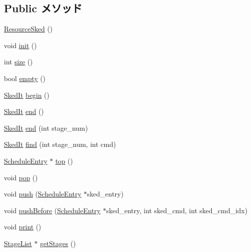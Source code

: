 \subsection*{Public メソッド}
\begin{DoxyCompactItemize}
\item 
\hyperlink{classResourceSked_aaaf7785027bb745b7d1e41dd0da8767a}{ResourceSked} ()
\item 
void \hyperlink{classResourceSked_a02fd73d861ef2e4aabb38c0c9ff82947}{init} ()
\item 
int \hyperlink{classResourceSked_af4b57d21919c42d55af03391f91a1c08}{size} ()
\item 
bool \hyperlink{classResourceSked_a3f37b042a1e7cd4bd38fc564de81f0da}{empty} ()
\item 
\hyperlink{classResourceSked_ab2a9eec675af76477619cacd99ea5225}{SkedIt} \hyperlink{classResourceSked_a7227fc077388658a1be7f6cae404798b}{begin} ()
\item 
\hyperlink{classResourceSked_ab2a9eec675af76477619cacd99ea5225}{SkedIt} \hyperlink{classResourceSked_a4143a7b8e61054ec5afbaf95b11997a3}{end} ()
\item 
\hyperlink{classResourceSked_ab2a9eec675af76477619cacd99ea5225}{SkedIt} \hyperlink{classResourceSked_aaf76f72bed236e2d9f89259942adba23}{end} (int stage\_\-num)
\item 
\hyperlink{classResourceSked_ab2a9eec675af76477619cacd99ea5225}{SkedIt} \hyperlink{classResourceSked_aa24faf36fbcfdcc28b6d24a25ba50427}{find} (int stage\_\-num, int cmd)
\item 
\hyperlink{structThePipeline_1_1ScheduleEntry}{ScheduleEntry} $\ast$ \hyperlink{classResourceSked_ade2a2e6ba16898f027e8269832f46da3}{top} ()
\item 
void \hyperlink{classResourceSked_a312e7f6c761a199c1369fbe651e084f0}{pop} ()
\item 
void \hyperlink{classResourceSked_aa963665051eed3db02917334982edc22}{push} (\hyperlink{classScheduleEntry}{ScheduleEntry} $\ast$sked\_\-entry)
\item 
void \hyperlink{classResourceSked_a9284522561e5c9c0e38d75fd9264374e}{pushBefore} (\hyperlink{classScheduleEntry}{ScheduleEntry} $\ast$sked\_\-entry, int sked\_\-cmd, int sked\_\-cmd\_\-idx)
\item 
void \hyperlink{classResourceSked_a388f572c62279f839ee138a9afbdeeb5}{print} ()
\item 
\hyperlink{classstd_1_1vector}{StageList} $\ast$ \hyperlink{classResourceSked_acea7e9a7691586cc080fd9872992fd61}{getStages} ()
\end{DoxyCompactItemize}
